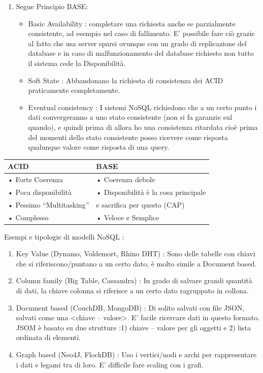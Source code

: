 \documentclass[a4page, 11pt]{article}
\begin{document}
\begin{enumerate}[noitemsep]
	\item
	Segue Principio BASE:
	\begin{itemize}
		
		\item
		Basic Availability : completare una richiesta anche se parzialmente consistente, ad esempio nel caso di fallimento. E' possibile fare ciò grazie al fatto che usa server sparsi ovunque con un grado di	replicazione del database e in caso di malfunzionamento del database richiesto non tutto il sistema cede la Disponibilità.
		\item
		Soft State : Abbandonano la richiesta di consistenza dei ACID praticamente completamente.
		\item
		Eventual consistency : I sistemi NoSQL richiedono che a un certo punto i dati convergeranno a uno stato consistente (non si fa garanzie sul quando), e quindi prima di allora ho una consistenza ritardata cioè prima del momenti dello stato consistente posso ricevere come risposta qualunque valore come risposta di una query.
	\end{itemize}
\end{enumerate}



\begin{center}
\begin{tabular}{|l|l|}
\hline
ACID & BASE \\
\hline
• Forte Coerenza & • Coerenza debole\\
• Poca disponibilità & • Disponibilità è la cosa principale\\
• Pessimo “Multitasking” & \quad e sacrifica per questo (CAP)\\
• Complesso & • Veloce e Semplice\\
\hline

\end{tabular}
\end{center}

Esempi e tipologie di modelli NoSQL :

\begin{enumerate}[noitemsep]
	 
	\item
	Key Value (Dynamo, Voldemort, Rhino DHT) : Sono delle tabelle con	chiavi che si riferiscono/puntano a un certo dato, è molto simile a Document based. 
	\item
	Column family (Big Table, Cassandra) : In grado di salvare grandi quantità di dati, la chiave colonna si riferisce a un certo dato ragruppato in collona.
	\item
	Document based (CouchDB, MongoDB) : Di solito salvati con file JSON, salvati come una \textless{}chiave -- valore\textgreater{}. E' facile ricercare dati in questo formato. JSOM è basato su due strutture :1) chiave -- valore per gli oggetti e 2) lista ordinata di elementi.
	\item
	Graph based (Neo4J, FlockDB) : Uso i vertici/nodi e archi per
	rappresentare i dati e legami tra di loro. E' difficile fare scaling	con i grafi.
\end{enumerate}
\end{document}
